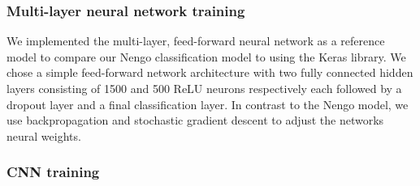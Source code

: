 \subsubsection{Multi-layer neural network training}%
\label{ssubsec:multi_layer_neural_network_training}

We implemented the multi-layer, feed-forward neural network as a reference model to compare our \ac{Nengo} classification model to using the Keras \cite{Chollet2015keras} library.
We chose a simple feed-forward network architecture with two fully connected hidden layers consisting of \num{1500} and \num{500} \ac{ReLU} neurons respectively each followed by a dropout layer and a final classification layer.
In contrast to the \ac{Nengo} model, we use backpropagation and stochastic gradient descent to adjust the networks neural weights.

\subsubsection{\acs{CNN} training}%
\label{ssubsec:cnn_training}

